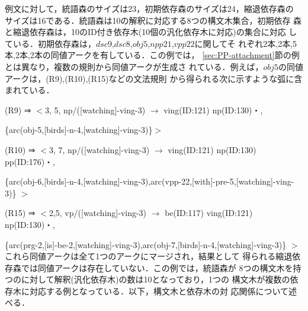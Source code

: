 例文に対して，統語森のサイズは23，初期依存森のサイズは24，縮退依存森の
サイズは16である．統語森は10の解釈に対応する8つの構文木集合，初期依存
森と縮退依存森は，10のID付き依存木(10個の汎化依存木に対応)の集合に対応
している．初期依存森は，$dsc9$,$dsc8$,$obj5$,$npp21$,$vpp22$に関してそ
れぞれ2本,2本,5本,2本,2本の同値アークを有している．この例では，
\ref{sec:PP-attachment}節の例とは異なり，複数の規則から同値アークが生成さ
れている．例えば，$obj5$の同値アークは，(R9),(R10),(R15)などの文法規則
から得られる次に示すような弧に含まれている．


\myhalfskip
 (R9) ⇒ $<$3, 5, np/([watching]-ving-3) $\rightarrow$ ving(ID:121) np(ID:130)・,

{\myitemindent}\{arc(obj-5,[birds]-n-4,[watching]-ving-3)\}$>$

 (R10) ⇒ $<$3, 7, np/([watching]-ving-3) $\rightarrow$ ving(ID:121) np(ID:130) pp(ID:176)・,
 
{\myitemindent}\{arc(obj-6,[birds]-n-4,[watching]-ving-3),arc(vpp-22,[with]-pre-5,[watching]-ving-3)\} $>$

 (R15) ⇒ $<$2,5, vp/([watching]-ving-3) $\rightarrow$ be(ID:117) ving(ID:121) np(ID:130)・, 

{\myitemindent}\{arc(prg-2,[is]-be-2,[watching]-ving-3),arc(obj-7,[birds]-n-4,[watching]-ving-3)\} $>$
\myhalfskip
{\mynoindent}これら同値アークは全て1つのアークにマージされ，結果として
得られる縮退依存森では同値アークは存在していない．この例では，統語森が
8つの構文木を持つのに対して解釈(汎化依存木)の数は10となっており，1つの
構文木が複数の依存木に対応する例となっている．以下，構文木と依存木の対
応関係について述べる．

